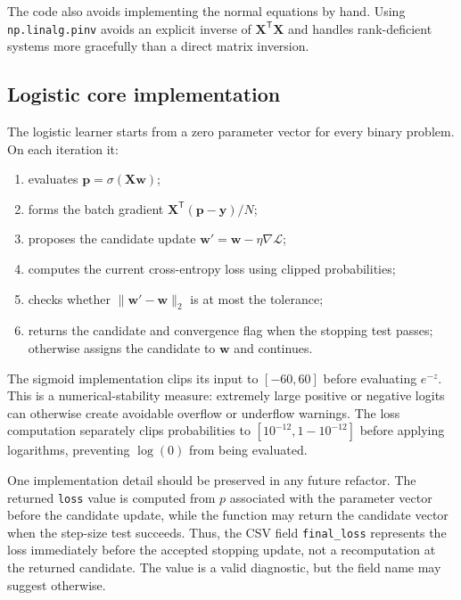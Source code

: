 \documentclass[11pt,a4paper]{article}
\newcommand{\code}[1]{\texttt{#1}}
\begin{document}
The code also avoids implementing the normal equations by hand. Using \code{np.linalg.pinv} avoids an explicit inverse of \(\mathbf{X}^{\mathsf T}\mathbf{X}\) and handles rank-deficient systems more gracefully than a direct matrix inversion.

\subsection{Logistic core implementation}
The logistic learner starts from a zero parameter vector for every binary problem. On each iteration it:
\begin{enumerate}
    \item evaluates \(\mathbf{p}=\sigma(\mathbf{Xw})\);
    \item forms the batch gradient \(\mathbf{X}^{\mathsf T}(\mathbf{p}-\mathbf{y})/N\);
    \item proposes the candidate update \(\mathbf{w}'=\mathbf{w}-\eta\nabla\mathcal{L}\);
    \item computes the current cross-entropy loss using clipped probabilities;
    \item checks whether \(\lVert\mathbf{w}'-\mathbf{w}\rVert_2\) is at most the tolerance;
    \item returns the candidate and convergence flag when the stopping test passes; otherwise assigns the candidate to \(\mathbf{w}\) and continues.
\end{enumerate}

The sigmoid implementation clips its input to \([-60,60]\) before evaluating \(e^{-z}\). This is a numerical-stability measure: extremely large positive or negative logits can otherwise create avoidable overflow or underflow warnings. The loss computation separately clips probabilities to \([10^{-12},1-10^{-12}]\) before applying logarithms, preventing \(\log(0)\) from being evaluated.

One implementation detail should be preserved in any future refactor. The returned \code{loss} value is computed from \(p\) associated with the parameter vector before the candidate update, while the function may return the candidate vector when the step-size test succeeds. Thus, the CSV field \code{final\_loss} represents the loss immediately before the accepted stopping update, not a recomputation at the returned candidate. The value is a valid diagnostic, but the field name may suggest otherwise.
\end{document}
